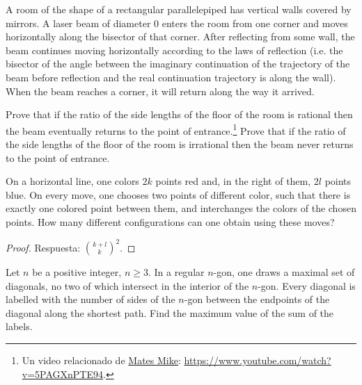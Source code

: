 \begin{probEG}
	A room of the shape of a rectangular parallelepiped has vertical walls covered by mirrors. A laser beam of diameter $0$ enters the room from one corner and moves horizontally along the bisector of that corner. After reflecting from some wall, the beam continues moving horizontally according to the laws of reflection (i.e. the bisector of the angle between the imaginary continuation of the trajectory of the beam before reflection and the real continuation trajectory is along the wall). When the beam reaches a corner, it will return along the way it arrived.
	\begin{enumerate}[(a)]
		\ii Prove that if the ratio of the side lengths of the floor of the room is rational then the beam eventually returns to the point of entrance.\footnote{Un video relacionado de \href{https://www.youtube.com/c/MatesMike}{Mates Mike}: \url{https://www.youtube.com/watch?v=5PAGXnPTE94}.}
		\ii Prove that if the ratio of the side lengths of the floor of the room is irrational then the beam never returns to the point of entrance.
	\end{enumerate}
\end{probEG}

\begin{probEG}
	On a horizontal line, one colors $2k$ points red and, in the right of them, $2l$ points blue. On every move, one chooses two points of different color, such that there is exactly one colored point between them, and interchanges the colors of the chosen points. How many different configurations can one obtain using these moves?
\end{probEG}

\begin{proof}
	Respuesta: $\binom{k+l}{k}^2$.
\end{proof}

\begin{problem}
	Let $n$ be a positive integer, $n\ge 3$. In a regular $n$-gon, one draws a maximal set of diagonals, no two of which intersect in the interior of the $n$-gon. Every diagonal is labelled with the number of sides of the $n$-gon between the endpoints of the diagonal along the shortest path. Find the maximum value of the sum of the labels.
\end{problem}


